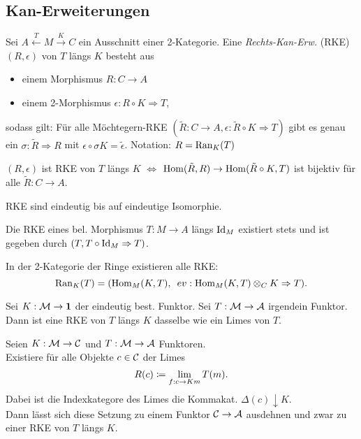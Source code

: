\documentclass{cheat-sheet}
\begin{document}
\subsection{Kan-Erweiterungen}

\begin{defn}
  Sei $A \xleftarrow{T} M \xrightarrow{K} C$ ein Ausschnitt einer 2-Kategorie. Eine \emph{Rechts-Kan-Erw.} (RKE) $(R, \epsilon)$ von $T$ längs $K$ besteht aus
  \begin{itemize}
    \item einem Morphismus $R : C \to A$
    \item einem 2-Morphismus $\epsilon : R \circ K \Rightarrow T$,
  \end{itemize}
  sodass gilt:
  Für alle Möchtegern-RKE $(\tilde{R} : C \to A, \epsilon : \tilde{R} \circ K \Rightarrow T)$ gibt es genau ein $\sigma : \tilde{R} \Rightarrow R$ mit $\epsilon \circ \sigma K = \tilde{\epsilon}$.
  Notation: $R = \operatorname{Ran}_K(T)$
\end{defn}

\begin{bem}
  $(R, \epsilon)$ ist RKE von $T$ längs $K$ $\iff$ $\operatorname{Hom}(\tilde{R}, R) \to \operatorname{Hom}(\tilde{R} \circ K, T)$ ist bijektiv für alle $\tilde{R} : C \to A$.
\end{bem}

\begin{prop}
  RKE sind eindeutig bis auf eindeutige Isomorphie.
\end{prop}

\begin{bsp}
  Die RKE eines bel. Morphismus $T : M \to A$ längs $\operatorname{Id}_M$ existiert stets und ist gegeben durch $(T, T \circ \operatorname{Id}_M \Rightarrow T)$.
\end{bsp}

\begin{bsp}
  In der 2-Kategorie der Ringe existieren alle RKE:
  \[ \operatorname{Ran}_K(T) = (\operatorname{Hom}_M(K, T), \enspace ev : \operatorname{Hom}_M(K, T) \otimes_C K \Rightarrow T). \]
\end{bsp}

\begin{bsp}
  Sei $K : \mathcal{M} \to \mathbf{1}$ der eindeutig best. Funktor. Sei $T : \mathcal{M} \to \mathcal{A}$ irgendein Funktor. Dann ist eine RKE von $T$ längs $K$ dasselbe wie ein Limes von $T$.
\end{bsp}

\begin{thm}
  Seien $K : \mathcal{M} \to \mathcal{C}$ und $T : \mathcal{M} \to \mathcal{A}$ Funktoren. \\
  Existiere für alle Objekte $c \in \mathcal{C}$ der Limes
  \[ R(c) \coloneqq \lim_{f : c \to Km} T(m). \]
  Dabei ist die Indexkategore des Limes die Kommakat. $\Delta(c) \downarrow K$. \\
  Dann lässt sich diese Setzung zu einem Funktor $\mathcal{C} \to \mathcal{A}$ ausdehnen und zwar zu einer RKE von $T$ längs $K$.
\end{thm}
\end{document}
